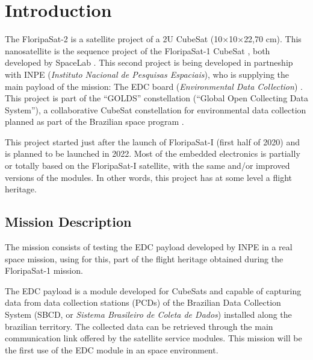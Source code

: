 %
%
%
%
%

%
%
%
%
%
%

\chapter{Introduction} \label{ch:introduction}

The FloripaSat-2 is a satellite project of a 2U CubeSat (10$\times$10$\times$22,70 cm). This nanosatellite is the sequence project of the FloripaSat-1 CubeSat \cite{floripasat}, both developed by SpaceLab \cite{spacelab}. This second project is being developed in partneship with INPE (\textit{Instituto Nacional de Pesquisas Espaciais}), who is supplying the main payload of the mission: The EDC board (\textit{Environmental Data Collection}) \cite{edc}. This project is part of the ``GOLDS'' constellation (``Global Open Collecting Data System''), a collaborative CubeSat constellation for environmental data collection planned as part of the Brazilian space program \cite{golds}.

This project started just after the launch of FloripaSat-I (first half of 2020) and is planned to be launched in 2022. Most of the embedded electronics is partially or totally based on the FloripaSat-I satellite, with the same and/or improved versions of the modules. In other words, this project has at some level a flight heritage.

\section{Mission Description}

The mission consists of testing the EDC payload developed by INPE in a real space mission, using for this, part of the flight heritage obtained during the FloripaSat-1 mission.

The EDC payload is a module developed for CubeSats and capable of capturing data from data collection stations (PCDs) of the Brazilian Data Collection System (SBCD, or \textit{Sistema Brasileiro de Coleta de Dados}) installed along the brazilian territory. The collected data can be retrieved through the main communication link offered by the satellite service modules. This mission will be the first use of the EDC module in an space environment.

